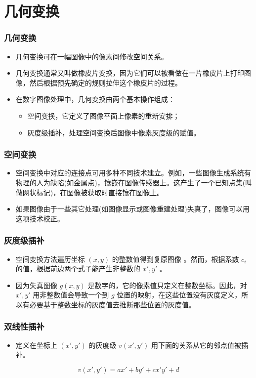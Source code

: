 \documentclass{beamer}
\begin{document}
\section{几何变换}
\label{sec-10}
\begin{frame}
\frametitle{几何变换}
\label{sec-10-1}

\begin{itemize}
\item 几何变换可在一幅图像中的像素间修改空间关系。
\item 几何变换通常又叫做橡皮片变换，因为它们可以被看做在一片橡皮片上打印图像，然后根据预先确定的规则拉伸这个橡皮片的过程。
\item 在数字图像处理中，几何变换由两个基本操作组成：
\begin{itemize}
\item 空间变换，它定义了图像平面上像素的重新安排；
\item 灰度级插补，处理空间变换后图像中像素灰度级的赋值。
\end{itemize}
\end{itemize}
\end{frame}
\begin{frame}
\frametitle{空间变换}
\label{sec-10-2}

\begin{itemize}
\item 空间变换中对应的连接点可用多种不同技术建立。例如，一些图像生成系统有物理的人为缺陷(如金属点)，镶嵌在图像传感器上。这产生了一个已知点集(叫做网状标记)，在图像被获取时直接镶在图像上。
\item 如果图像由于一些其它处理(如图像显示或图像重建处理)失真了，图像可以用这项技术校正。
\end{itemize}
\end{frame}
\begin{frame}
\frametitle{灰度级插补}
\label{sec-10-3}

\begin{itemize}
\item 空间变换方法遍历坐标 $(x,y)$ 的整数值得到复原图像 。然而，根据系数 $c_i$ 的值，根据前边两个式子能产生非整数的 $x',y'$ 。
\item 因为失真图像 $g(x,y)$ 是数字的，它的像素值只定义在整数坐标。因此，对 $x',y'$ 用非整数值会导致一个到 $g$ 位置的映射，在这些位置没有灰度定义，所以有必要基于整数坐标的灰度值去推断那些位置的灰度值。
\end{itemize}
\end{frame}
\begin{frame}
\frametitle{双线性插补}
\label{sec-10-4}

\begin{itemize}
\item 定义在坐标上 $(x',y')$ 的灰度级 $v(x',y')$ 用下面的关系从它的邻点值被插补。
\end{itemize}

\[ v(x',y')=a x'+by'+cx'y'+d \]
\end{frame}
\end{document}
